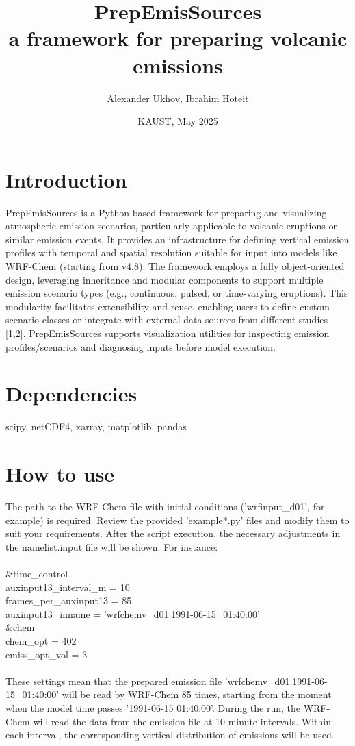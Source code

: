 \documentclass{article}
\title{PrepEmisSources \\ a framework for preparing volcanic emissions}
\author{Alexander Ukhov, Ibrahim Hoteit}
\date{KAUST, May 2025}
\begin{document}
\maketitle

\section{Introduction}
PrepEmisSources is a Python-based framework for preparing and visualizing atmospheric emission scenarios, particularly applicable to volcanic eruptions or similar emission events. It provides an infrastructure for defining vertical emission profiles with temporal and spatial resolution suitable for input into models like WRF-Chem (starting from v4.8). The framework employs a fully object-oriented design, leveraging inheritance and modular components to support multiple emission scenario types (e.g., continuous, pulsed, or time-varying eruptions). This modularity facilitates extensibility and reuse, enabling users to define custom scenario classes or integrate with external data sources from different studies [1,2]. PrepEmisSources supports visualization utilities for inspecting emission profiles/scenarios and diagnosing inputs before model execution.

\section{Dependencies}

scipy, netCDF4, xarray, matplotlib, pandas

\section{How to use}
The path to the WRF-Chem file with initial conditions ('wrfinput\_d01', for example) is required. Review the provided 'example*.py' files and modify them to suit your requirements. After the script execution, the necessary adjustments in the namelist.input file will be shown. For instance: \\ \\
    \&time\_control  \\
        auxinput13\_interval\_m = 10 \\
        frames\_per\_auxinput13 = 85 \\
        auxinput13\_inname     = 'wrfchemv\_d01.1991-06-15\_01:40:00' \\
    \&chem \\
        chem\_opt               = 402   \\
        emiss\_opt\_vol          = 3    \\ \\
These settings mean that the prepared emission file 'wrfchemv\_d01.1991-06-15\_01:40:00' will be read by WRF-Chem 85 times, starting from the moment when the model time passes '1991-06-15 01:40:00'. During the run, the WRF-Chem will read the data from the emission file at 10-minute intervals. Within each interval, the corresponding vertical distribution of emissions will be used.
\end{document}
